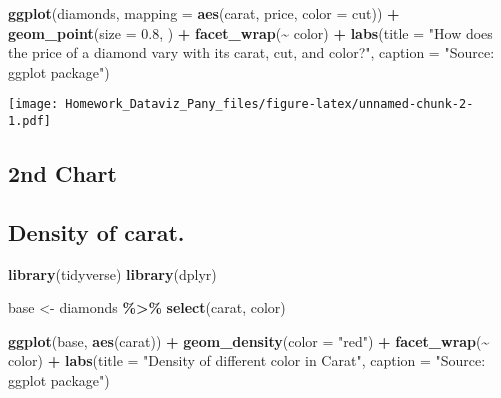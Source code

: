 \documentclass[
]{article}
\newenvironment{Shaded}{\begin{snugshade}}{\end{snugshade}}
\newcommand{\AttributeTok}[1]{\textcolor[rgb]{0.13,0.29,0.53}{#1}}
\newcommand{\FloatTok}[1]{\textcolor[rgb]{0.00,0.00,0.81}{#1}}
\newcommand{\FunctionTok}[1]{\textcolor[rgb]{0.13,0.29,0.53}{\textbf{#1}}}
\newcommand{\NormalTok}[1]{#1}
\newcommand{\OtherTok}[1]{\textcolor[rgb]{0.56,0.35,0.01}{#1}}
\newcommand{\SpecialCharTok}[1]{\textcolor[rgb]{0.81,0.36,0.00}{\textbf{#1}}}
\newcommand{\StringTok}[1]{\textcolor[rgb]{0.31,0.60,0.02}{#1}}
\begin{document}
\begin{Shaded}
\begin{Highlighting}[]
\FunctionTok{ggplot}\NormalTok{(diamonds,}
       \AttributeTok{mapping =} \FunctionTok{aes}\NormalTok{(carat, price, }\AttributeTok{color =}\NormalTok{ cut)) }\SpecialCharTok{+}
  \FunctionTok{geom\_point}\NormalTok{(}\AttributeTok{size =} \FloatTok{0.8}\NormalTok{, ) }\SpecialCharTok{+}
  \FunctionTok{facet\_wrap}\NormalTok{(}\SpecialCharTok{\textasciitilde{}}\NormalTok{ color) }\SpecialCharTok{+}
  \FunctionTok{labs}\NormalTok{(}\AttributeTok{title =} \StringTok{"How does the price of a diamond vary with its carat, cut, and color?"}\NormalTok{,}
       \AttributeTok{caption =} \StringTok{"Source: ggplot package"}\NormalTok{) }
\end{Highlighting}
\end{Shaded}

\texttt{[image: Homework\_Dataviz\_Pany\_files/figure-latex/unnamed-chunk-2-1.pdf]}

\subsection{2nd Chart}\label{nd-chart}

\subsection{Density of carat.}\label{density-of-carat.}

\begin{Shaded}
\begin{Highlighting}[]
\FunctionTok{library}\NormalTok{(tidyverse)}
\FunctionTok{library}\NormalTok{(dplyr)}

\NormalTok{base }\OtherTok{\textless{}{-}}\NormalTok{ diamonds }\SpecialCharTok{\%\textgreater{}\%}
  \FunctionTok{select}\NormalTok{(carat, color)}

\FunctionTok{ggplot}\NormalTok{(base,}
       \FunctionTok{aes}\NormalTok{(carat)) }\SpecialCharTok{+}
  \FunctionTok{geom\_density}\NormalTok{(}\AttributeTok{color =} \StringTok{"red"}\NormalTok{) }\SpecialCharTok{+}
  \FunctionTok{facet\_wrap}\NormalTok{(}\SpecialCharTok{\textasciitilde{}}\NormalTok{ color) }\SpecialCharTok{+}
  \FunctionTok{labs}\NormalTok{(}\AttributeTok{title =} \StringTok{"Density of different color in Carat"}\NormalTok{,}
       \AttributeTok{caption =} \StringTok{"Source: ggplot package"}\NormalTok{)}
\end{Highlighting}
\end{Shaded}
\end{document}
